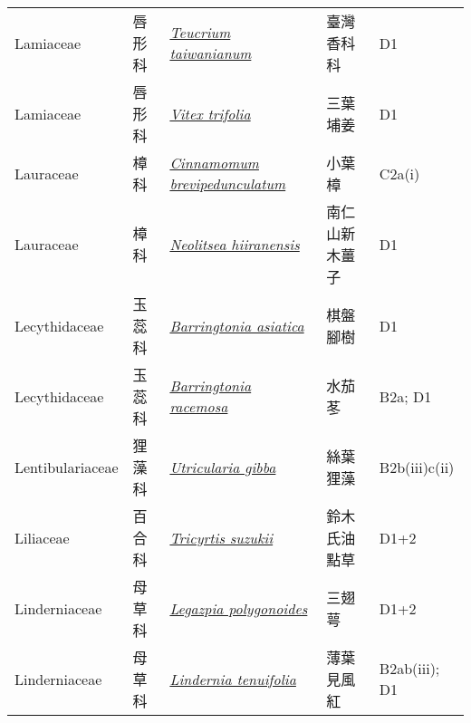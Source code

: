 {\begin{longtable}{p{2.5cm}p{2.5cm}p{4.5cm}p{2.5cm}p{3cm}}
    Lamiaceae & 唇形科 & \href{http://www.theplantlist.org/tpl1.1/search?q=Teucrium+taiwanianum}{\textit{Teucrium taiwanianum} } & 臺灣香科科 & D1 \index{Teucrium@\textit{Teucrium}!taiwanianum@\textit{taiwanianum}}  \index{臺灣香科科} \\
    Lamiaceae & 唇形科 & \href{http://www.theplantlist.org/tpl1.1/search?q=Vitex+trifolia}{\textit{Vitex trifolia} } & 三葉埔姜 & D1 \index{Vitex@\textit{Vitex}!trifolia@\textit{trifolia}}  \index{三葉埔姜} \\
    Lauraceae & 樟科 & \href{http://www.theplantlist.org/tpl1.1/search?q=Cinnamomum+brevipedunculatum}{\textit{Cinnamomum brevipedunculatum} } & 小葉樟 & C2a(i) \index{Cinnamomum@\textit{Cinnamomum}!brevipedunculatum@\textit{brevipedunculatum}}  \index{小葉樟} \\
    Lauraceae & 樟科 & \href{http://www.theplantlist.org/tpl1.1/search?q=Neolitsea+hiiranensis}{\textit{Neolitsea hiiranensis} } & 南仁山新木薑子 & D1 \index{Neolitsea@\textit{Neolitsea}!hiiranensis@\textit{hiiranensis}}  \index{南仁山新木薑子} \\
    Lecythidaceae & 玉蕊科 & \href{http://www.theplantlist.org/tpl1.1/search?q=Barringtonia+asiatica}{\textit{Barringtonia asiatica} } & 棋盤腳樹 & D1 \index{Barringtonia@\textit{Barringtonia}!asiatica@\textit{asiatica}}  \index{棋盤腳樹} \\
    Lecythidaceae & 玉蕊科 & \href{http://www.theplantlist.org/tpl1.1/search?q=Barringtonia+racemosa}{\textit{Barringtonia racemosa} } & 水茄苳 & B2a; D1 \index{Barringtonia@\textit{Barringtonia}!racemosa@\textit{racemosa}}  \index{水茄苳} \\
    Lentibulariaceae & 狸藻科 & \href{http://www.theplantlist.org/tpl1.1/search?q=Utricularia+gibba}{\textit{Utricularia gibba} } & 絲葉狸藻 & B2b(iii)c(ii) \index{Utricularia@\textit{Utricularia}!gibba@\textit{gibba}}  \index{絲葉狸藻} \\
    Liliaceae & 百合科 & \href{http://www.theplantlist.org/tpl1.1/search?q=Tricyrtis+suzukii}{\textit{Tricyrtis suzukii} } & 鈴木氏油點草 & D1+2 \index{Tricyrtis@\textit{Tricyrtis}!suzukii@\textit{suzukii}}  \index{鈴木氏油點草} \\
    Linderniaceae & 母草科 & \href{http://www.theplantlist.org/tpl1.1/search?q=Legazpia+polygonoides}{\textit{Legazpia polygonoides} } & 三翅萼 & D1+2 \index{Legazpia@\textit{Legazpia}!polygonoides@\textit{polygonoides}}  \index{三翅萼} \\
    Linderniaceae & 母草科 & \href{http://www.theplantlist.org/tpl1.1/search?q=Lindernia+tenuifolia}{\textit{Lindernia tenuifolia} } & 薄葉見風紅 & B2ab(iii); D1 \index{Lindernia@\textit{Lindernia}!tenuifolia@\textit{tenuifolia}}  \index{薄葉見風紅} \\

\end{longtable}}
